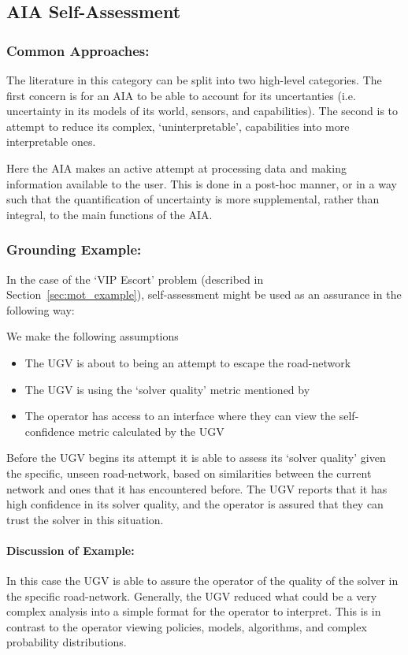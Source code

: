 \subsection{AIA Self-Assessment} \label{sec:aia_self_assessment}

\subsubsection{Common Approaches:}
The literature in this category can be split into two high-level categories. The first concern is for an AIA to be able to account for its uncertanties (i.e. uncertainty in its models of its world, sensors, and capabilities). The second is to attempt to reduce its complex, `uninterpretable', capabilities into more interpretable ones.

Here the AIA makes an active attempt at processing data and making information available to the user. This is done in a post-hoc manner, or in a way such that the quantification of uncertainty is more supplemental, rather than integral, to the main functions of the AIA.




\subsubsection{Grounding Example:}
In the case of the `VIP Escort' problem (described in Section~\ref{sec:mot_example}), self-assessment might be used as an assurance in the following way:

We make the following assumptions

\begin{itemize}
    \item The UGV is about to being an attempt to escape the road-network
    \item The UGV is using the `solver quality' metric mentioned by \citet{Aitken2016-fb}
    \item The operator has access to an interface where they can view the self-confidence metric calculated by the UGV
\end{itemize}

Before the UGV begins its attempt it is able to assess its `solver quality' given the specific, unseen road-network, based on similarities between the current network and ones that it has encountered before. The UGV reports that it has high confidence in its solver quality, and the operator is assured that they can trust the solver in this situation.

\paragraph{\textbf{Discussion of Example:}} In this case the UGV is able to assure the operator of the quality of the solver in the specific road-network. Generally, the UGV reduced what could be a very complex analysis into a simple format for the operator to interpret. This is in contrast to the operator viewing policies, models, algorithms, and complex probability distributions.
